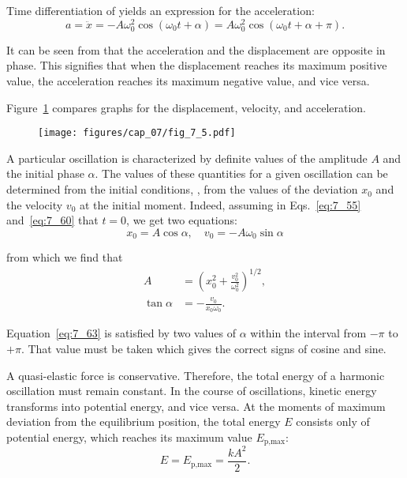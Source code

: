 Time differentiation of  yields an expression for the acceleration:
\begin{equation}\label{eq:7_61}
	a = \ddot{x} = -A\omega_0^2\cos(\omega_0 t + \alpha) = A\omega_0^2\cos(\omega_0 t + \alpha + \pi).
\end{equation}

\noindent
It can be seen from  that the acceleration and the displacement are opposite in phase. This signifies that when the displacement reaches its maximum positive value, the acceleration reaches its maximum negative value, and vice versa.

Figure~\ref{fig:7_5} compares graphs for the displacement, velocity, and acceleration.

\begin{figure}[t]
	\begin{center}
		\texttt{[image: figures/cap\_07/fig\_7\_5.pdf]}
		\caption[]{}
		\label{fig:7_5}
	\end{center}
	\vspace{-1.0cm}
\end{figure}

A particular oscillation is characterized by definite values of the amplitude $A$ and the initial phase $\alpha$. The values of these quantities for a given oscillation can be determined from the initial conditions, \ie, from the values of the deviation $x_0$ and the velocity $v_0$ at the initial moment. Indeed, assuming in Eqs.~\eqref{eq:7_55} and~\eqref{eq:7_60} that $t=0$, we get two equations:
\begin{equation*}
	x_0 = A\cos\alpha,\quad v_0 = -A\omega_0\sin\alpha
\end{equation*}

\noindent
from which we find that
\begin{align}
	A &= \left(x_0^2 + \frac{v_0^2}{\omega_0^2}\right)^{1/2}, \label{eq:7_62}\\
	\tan\alpha &= -\frac{v_0}{x_0\omega_0}.\label{eq:7_63}
\end{align}

\noindent
Equation~\eqref{eq:7_63} is satisfied by two values of $\alpha$ within the interval from $-\pi$ to $+\pi$. That value must be taken which gives the correct signs of cosine and sine.

A quasi-elastic force is conservative. Therefore, the total energy of a harmonic oscillation must remain constant. In the course of oscillations, kinetic energy transforms into potential energy, and vice versa. At the moments of maximum deviation from the equilibrium position, the total energy $E$ consists only of potential energy, which reaches its maximum value $E_{\text{p,max}}$:
\begin{equation}\label{eq:7_64}
	E = E_{\text{p,max}} = \frac{kA^2}{2}.
\end{equation}


